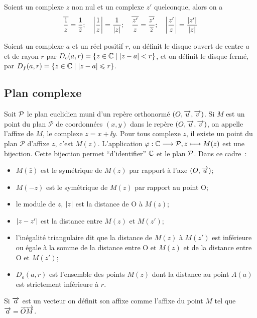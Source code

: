 \begin{prop}
  Soient un complexe \(z\) non nul et un complexe \(z'\) quelconque, alors on a
  \begin{equation}
      \bar{\frac{1}{z}}=\frac{1}{\bar{z}}; \quad \abs{\frac{1}{z}}=\frac{1}{\abs{z}}; \quad
      \bar{\frac{z'}{z}}=\frac{\bar{z'}}{\bar{z}}; \quad \abs{\frac{z'}{z}}=\frac{\abs{z'}}{\abs{z}}
  \end{equation}
\end{prop}
%
\begin{defdef}
  Soient un complexe \(a\) et un réel positif \(r\), on définit le disque ouvert de centre \(a\) et de rayon \(r\) par \(D_o(a,r)=\enstq{z\in\C}{\abs{z-a}<r}\), et on définit le disque fermé, par \(D_f(a,r)=\enstq{z\in\C}{\abs{z-a}\leqslant r}\).
\end{defdef}
%
\subsection{Plan complexe}
\label{subsec:plancomplexe}
%
Soit \(\P\) le plan euclidien muni d'un repère orthonormé \((O,\vect{u}, \vect{v})\). Si \(M\) est un point du plan \(\mathcal{P}\) de coordonnées \((x,y)\) dans le repère \((O,\vect{u}, \vect{v})\), on appelle l'affixe de \(M\), le complexe \(z=x + \ii y\). Pour tous complexe \(z\), il existe un point du plan \(\mathcal{P}\) d'affixe \(z\), c'est \(M(z)\). L'application \(\fonctionL{\varphi}{\C}{\P}{z}{M(z)}\) est une bijection. Cette bijection permet ``d'identifier'' \(\C\) et le plan \(\P\). Dans ce cadre~:
\begin{itemize}
\item \(M(\bar{z})\) est le symétrique de \(M(z)\) par rapport à l'axe \((O,\vect{u})\);
\item \(M(-z)\) est le symétrique de \(M(z)\) par rapport au point O;
\item le module de \(z\), \(\abs{z}\) est la distance de O à \(M(z)\);
\item \(\abs{z-z'}\) est la distance entre \(M(z)\) et \(M(z')\);
\item l'inégalité triangulaire dit que la distance de \(M(z)\) à \(M(z')\) est inférieure ou égale à la somme de la distance entre O et \(M(z)\) et de la distance entre O et \(M(z')\);
\item \(D_o(a,r)\) est l'ensemble des points \(M(z)\) dont la distance au point \(A(a)\) est strictement inférieure à \(r\).
\end{itemize}
Si \(\vect{a}\) est un vecteur on définit son affixe comme l'affixe du point \(M\) tel que \(\vect{a}=\vect{OM}\).

